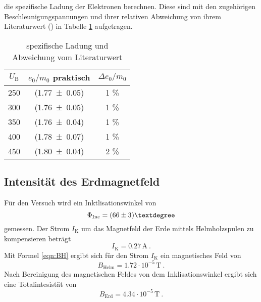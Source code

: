 die spezifische Ladung der Elektronen berechnen. Diese sind mit den zugehörigen Beschleunigungspannungen und ihrer relativen Abweichung von ihrem Literaturwert (\cite{spez}) in Tabelle \ref{tab:e0m0} aufgetragen.
\begin{table}
  \centering
  \begin{tabular}{c| c c}
    \toprule
    $U_\text{B}$  & $e_0/m_0$ praktisch & $\Delta e_0/m_0$ \\
    \midrule
    	250	& (\num{1.77 +- 0.05}) & 1 \% \\
	300	& (\num{1.76 +- 0.05}) & 1 \% \\
	350	& (\num{1.76 +- 0.04}) & 1 \% \\
	400	& (\num{1.78 +- 0.07}) & 1 \% \\
	450	& (\num{1.80 +- 0.04}) & 2 \% \\
    \bottomrule
  \end{tabular}
  \caption{spezifische Ladung und Abweichung vom Literaturwert}
  \label{tab:e0m0}
\end{table}
\subsection{Intensität des Erdmagnetfeld}
Für den Versuch wird ein Inktlisationswinkel von
\begin{equation}
  \Phi_\text{Inc} = (\num{66 +-3})°
  \label{eqn:Inc}
\end{equation}
gemessen. Der Strom $I_\text{K}$ um das Magnetfeld der Erde mittels Helmholzspulen zu kompensieren beträgt
\begin{equation}
  I_\text{K} = 0.27 \, \text{A} \ .
  \label{IK}
\end{equation}
Mit Formel \ref{eqn:BH} ergibt sich für den Strom $I_\text{K}$ ein magnetisches Feld von
\begin{equation}
  B_\text{Helm} = 1.72 \cdot 10^{-5} \, \text{T} \ .
  \label{eqn:Binc}
\end{equation}
Nach Bereinigung des magnetischen Feldes von dem Inklisationswinkel ergibt sich eine Totalintesistät von
\begin{equation}
  B_\text{Erd} = 4.34 \cdot 10^{-5} \, \text{T} \ .
  \label{eqn:Berd}
\end{equation}
